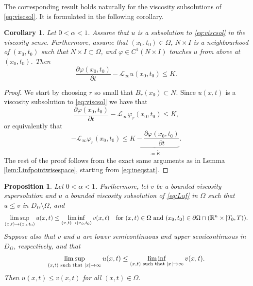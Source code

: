 \documentclass[11pt]{article}
\providecommand{\Linf}{\mathcal{L}_{\infty}}
\providecommand{\Rn}{\mathbb{R}^n}
\providecommand{\Ns}{N \times I}
\providecommand{\Rnp}{D_{\Omega}}
\providecommand{\RnpO}{D_{\Omega}\setminus \Omega}
\newtheorem{prop}[thm]{Proposition}
\newtheorem{cor}[thm]{Corollary}
\numberwithin{equation}{section}
\theoremstyle{definition}
\begin{document}
The corresponding result holds naturally for the viscosity subsolutions of \eqref{eq:viscsol}. It is formulated in the following corollary.
\begin{cor}\label{cor:Linfpointwise}
     Let $0<\alpha <1$. Assume that $u$ is a subsolution to \eqref{eq:viscsol}
     in the viscosity sense. Furthermore, assume that $(x_0,t_0) \in \Omega$,  $\Ns $ is a neighbourhood of $(x_0,t_0)$ such that $ \Ns \subset \Omega$, and $\varphi \in C^1(\Ns)$ touches $u$ from above at $(x_0,t_0)$. Then 
     \begin{equation*}
        \frac{\partial \varphi(x_0,t_0)}{\partial t} - \Linf u(x_0,t_0) \leq K.   
     \end{equation*}
\end{cor}
\begin{proof}
We start by choosing $r$ so small that $B_r(x_0) \subset N$. Since $u(x,t)$ is a viscosity subsolution to \eqref{eq:viscsol} we have that
\begin{equation*}
    \frac{\partial \varphi(x_0,t_0) }{\partial t}-\Linf \varphi_r(x_0,t_0) \leq K,
\end{equation*}   
or equivalently that
\begin{equation*}
    -\Linf \varphi_r(x_0,t_0) \leq \underbrace{K-  \frac{\partial \varphi(x_0,t_0) }{\partial t}}_{:= \tilde{K}}.
\end{equation*}
The rest of the proof follows from the exact same arguments as in Lemma \ref{lem:Linfpointwisespace}, starting from \eqref{eq:ineqstat}.
\end{proof}

 \begin{prop}\label{lem:compprinc}
    Let $0<\alpha <1$. Furthermore, let $v$ be a bounded viscosity supersolution and $u$ a bounded viscosity subsolution of \eqref{eq:Luf} in $\Omega$ such that $u \leq v$ in $\RnpO$, and
    $$
   \limsup_{(x,t) \to (x_0,t_0)} u(x,t) \leq  \liminf_{(x,t) \to (x_0,t_0)} v(x,t) \quad \textup{for } (x,t) \in  \Omega \textup{ and } (x_0,t_0) \in \partial \Omega \cap (\Rn \times[T_0,T)).
    $$
    Suppose also that $v$ and $u$ are lower semicontinuous and upper semicontinuous in $\Rnp$, respectively, and that
        \begin{equation}\label{eq:limitatinf}
               \limsup_{(x,t) \textup{ such that } |x| \to \infty} u(x,t) \leq  \liminf_{(x,t) \textup{ such that } |x| \to \infty} v(x,t).
        \end{equation}
    Then $u(x,t) \leq v(x,t)$ for all $(x,t) \in \Omega$. 
\end{prop}
\end{document}
